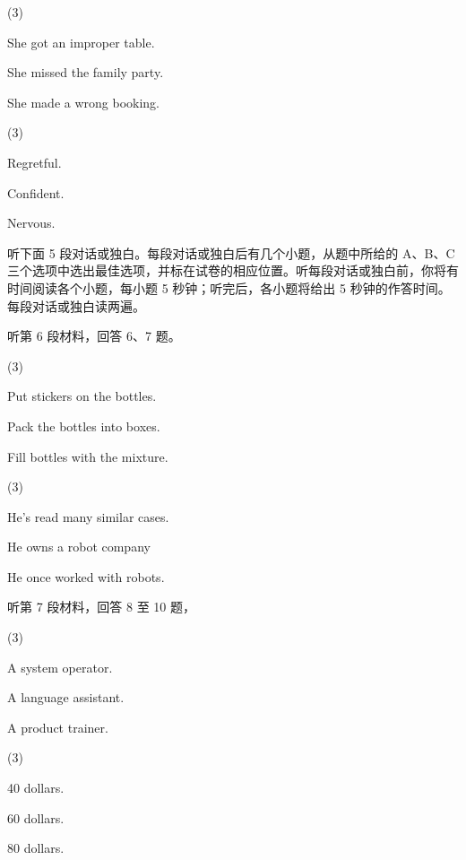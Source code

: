 \documentclass{英语试卷}
\begin{document}
\begin{choices}(3)
  \item She got an improper table.
  \item She missed the family party.
  \item She made a wrong booking.
\end{choices}
\begin{choices}(3)
  \item Regretful.
  \item Confident.
  \item Nervous.
\end{choices}
\par 听下面 5 段对话或独白。每段对话或独白后有几个小题，从题中所给的 A、B、C 三个选项中选出最佳选项，并标在试卷的相应位置。听每段对话或独白前，你将有时间阅读各个小题，每小题 5 秒钟；听完后，各小题将给出 5 秒钟的作答时间。每段对话或独白读两遍。\par
\par 听第 6 段材料，回答 6、7 题。\par
{}
\begin{choices}(3)
  \item Put stickers on the bottles.
  \item Pack the bottles into boxes.
  \item Fill bottles with the mixture.
\end{choices}
\begin{choices}(3)
  \item He's read many similar cases.
  \item He owns a robot company
  \item He once worked with robots.
\end{choices}
\par 听第 7 段材料，回答 8 至 10 题，\par
{}
\begin{choices}(3)
  \item A system operator.
  \item A language assistant.
  \item A product trainer.
\end{choices}
\begin{choices}(3)
  \item 40 dollars.
  \item 60 dollars.
  \item 80 dollars.
\end{choices}
\end{document}
